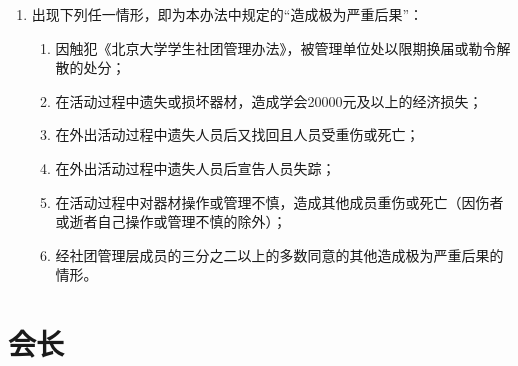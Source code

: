 \begin{enumerate}
    \item 出现下列任一情形，即为本办法中规定的“造成极为严重后果”：
    \begin{enumerate}
        \item 因触犯《北京大学学生社团管理办法》，被管理单位处以限期换届或勒令解散的处分；
        \item 在活动过程中遗失或损坏器材，造成学会20000元及以上的经济损失；
        \item 在外出活动过程中遗失人员后又找回且人员受重伤或死亡；
        \item 在外出活动过程中遗失人员后宣告人员失踪；
        \item 在活动过程中对器材操作或管理不慎，造成其他成员重伤或死亡（因伤者或逝者自己操作或管理不慎的除外）；
        \item 经社团管理层成员的三分之二以上的多数同意的其他造成极为严重后果的情形。
    \end{enumerate}
\end{enumerate}

\section{会长}

